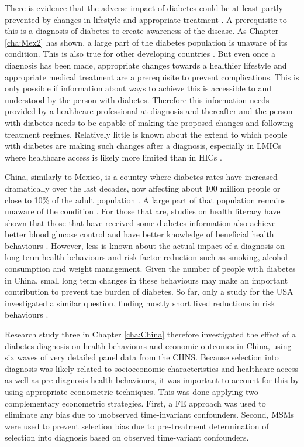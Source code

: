 There is evidence that the adverse impact of diabetes could be at least partly prevented by changes in lifestyle and appropriate treatment \parencite{Wareham2016}. A prerequisite to this is a diagnosis of diabetes to create awareness of the disease. As Chapter \ref{cha:Mex2} has shown, a large part of the diabetes population is unaware of its condition. This is also true for other developing countries \parencite{Beagley2014}. But even once a diagnosis has been made, appropriate changes towards a healthier lifestyle and appropriate medical treatment are a prerequisite to prevent complications. This is only possible if information about ways to achieve this is accessible to and understood by the person with diabetes. Therefore this information needs provided by a healthcare professional at diagnosis and thereafter and the person with diabetes needs to be capable of making the proposed changes and following treatment regimes. Relatively little is known about the extend to which people with diabetes are making such changes after a diagnosis, especially in \acp{LMIC} where healthcare access is likely more limited than in \acp{HIC} \parencite{Mills2014}.

China, similarly to Mexico, is a country where diabetes rates have increased dramatically over the last decades, now affecting about 100 million people or close to 10\% of the adult population \parencite{Risk2016}. A large part of that population remains unaware of the condition \parencite{Wang2015}. For those that are, studies on health literacy have shown that those that have received some diabetes information also achieve better blood glucose control and have better knowledge of beneficial health behaviours \parencite{Guo2012}. However, less is known about the actual impact of a diagnosis on long term health behaviours and risk factor reduction such as smoking, alcohol consumption and weight management. Given the number of people with diabetes in China, small long term changes in these behaviours may make an important contribution to prevent the burden of diabetes. So far, only a study for the USA investigated a similar question, finding mostly short lived reductions in risk behaviours \parencite{Slade2012}. 

Research study three in Chapter \ref{cha:China} therefore investigated the effect of a diabetes diagnosis on health behaviours and economic outcomes in China, using six waves of very detailed panel data from the \ac{CHNS}. Because selection into diagnosis was likely related to socioeconomic characteristics and healthcare access as well as pre-diagnosis health behaviours, it was important to account for this by using appropriate econometric techniques. This was done applying two complementary econometric strategies. First, a \ac{FE} approach was used to eliminate any bias due to unobserved time-invariant confounders. Second, \acp{MSM} were used to prevent selection bias due to pre-treatment determination of selection into diagnosis based on observed time-variant confounders.

